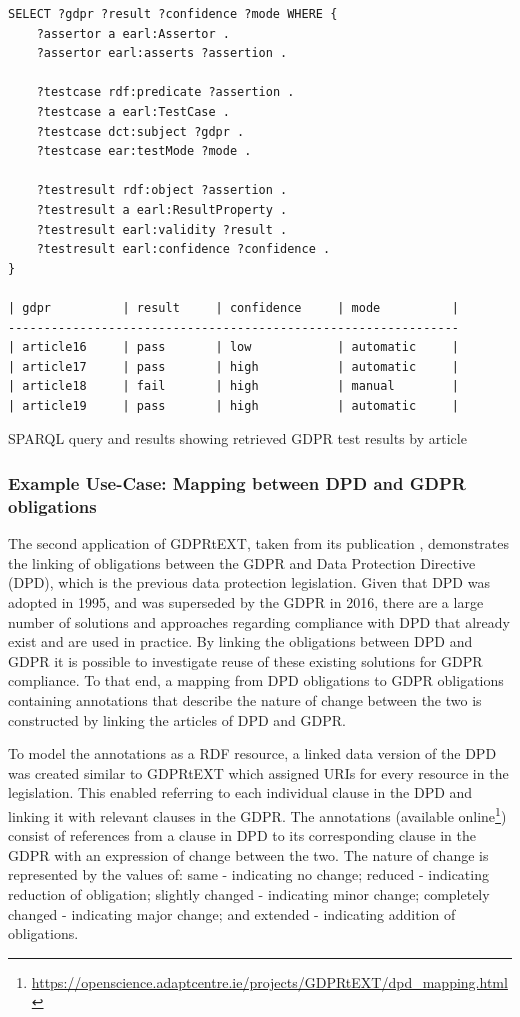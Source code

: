 \begin{listing}
\begin{verbatim}
SELECT ?gdpr ?result ?confidence ?mode WHERE {
    ?assertor a earl:Assertor .
    ?assertor earl:asserts ?assertion .

    ?testcase rdf:predicate ?assertion .
    ?testcase a earl:TestCase .
    ?testcase dct:subject ?gdpr .
    ?testcase ear:testMode ?mode .

    ?testresult rdf:object ?assertion .
    ?testresult a earl:ResultProperty .
    ?testresult earl:validity ?result .
    ?testresult earl:confidence ?confidence .
}

| gdpr          | result     | confidence     | mode          |
---------------------------------------------------------------
| article16     | pass       | low            | automatic     |
| article17     | pass       | high           | automatic     |
| article18     | fail       | high           | manual        |
| article19     | pass       | high           | automatic     |
\end{verbatim}
\label{code:voc:gdprtext-sparql}
\caption{SPARQL query and results showing retrieved GDPR test results by article}
\end{listing}

\subsubsection{Example Use-Case: Mapping between DPD and GDPR obligations}
The second application of GDPRtEXT, taken from its publication \cite{pandit_gdprtext_2018}, demonstrates the linking of obligations between the GDPR and Data Protection Directive (DPD), which is the previous data protection legislation. Given that DPD was adopted in 1995, and was superseded by the GDPR in 2016, there are a large number of solutions and approaches regarding compliance with DPD that already exist and are used in practice. By linking the obligations between DPD and GDPR it is possible to investigate reuse of these existing solutions for GDPR compliance. To that end, a mapping from DPD obligations to GDPR obligations containing annotations that describe the nature of change between the two is constructed by linking the articles of DPD and GDPR.

To model the annotations as a RDF resource, a linked data version of the DPD was created similar to GDPRtEXT which assigned URIs for every resource in the legislation. This enabled referring to each individual clause in the DPD and linking it with relevant clauses in the GDPR. 
The annotations (available online\footnote{\url{https://openscience.adaptcentre.ie/projects/GDPRtEXT/dpd_mapping.html}}) consist of references from a clause in DPD to its corresponding clause in the GDPR with an expression of change between the two. The nature of change is represented by the values of: same - indicating no change; reduced - indicating reduction of obligation; slightly changed - indicating minor change; completely changed - indicating major change; and extended - indicating addition of obligations.

